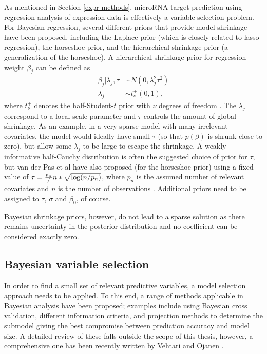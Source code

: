 As mentioned in Section \ref{expr-methods}, microRNA target prediction using
regression analysis of expression data is effectively a variable selection
problem. For Bayesian regression, several different priors that provide model shrinkage
have been proposed, including the Laplace prior (which is closely related to
lasso regression), the horseshoe prior, and the hierarchical shrinkage prior
(a generalization of the horseshoe).
A hierarchical shrinkage prior for regression weight
$\beta_j$ can be defined as
\begin{subequations}
  \label{eq:hs-prior}
  \begin{align}
    \beta_j | \lambda_j, \tau & \sim N(0, \lambda_j^2 \tau^2) \\
    \lambda_j                 & \sim t_\nu^+(0,1),
  \end{align}
\end{subequations}
where $t_\nu^+$ denotes the half-Student-$t$ prior with $\nu$ degrees of
freedom \citep{Piironen2015}. The $\lambda_j$ correspond to a local scale
parameter and $\tau$ controls the amount of global shrinkage. As an example,
in a very sparse model with many irrelevant covariates, the model would
ideally have small $\tau$ (so that $p(\beta)$ is shrunk close to zero), but
allow some $\lambda_j$ to be large to escape the shrinkage. A weakly
informative half-Cauchy distribution is often the suggested choice of prior
for $\tau$, but van der Pas et al have also proposed (for the horseshoe prior)
using a fixed value of $\tau = \frac{p_n}/{n}*\sqrt{\textup{log}(n/p_n)}$,
where $p_n$ is the assumed number of relevant covariates and $n$ is the number
of observations \citep{vanderpas2014}. Additional priors need to be
assigned to $\tau$, $\sigma$ and $\beta_0$, of course.

Bayesian shrinkage priors, however, do not lead to a sparse solution as there remains
uncertainty in the posterior distribution and no coefficient can be considered
exactly zero.


\subsection{Bayesian variable selection}\label{sec:bayes-variable-selection}

In order to find a small set of relevant predictive variables, a model
selection approach needs to be applied. To this end, a range of methods
applicable in Bayesian analysis have been proposed; examples include using
Bayesian cross validation, different information criteria, and projection
methods to determine the submodel giving the best compromise between
prediction accuracy and model size. A detailed review of these falls outside
the scope of this thesis, however, a comprehensive one has been recently
written by Vehtari and Ojanen
\citep{Vehtari2012}.

